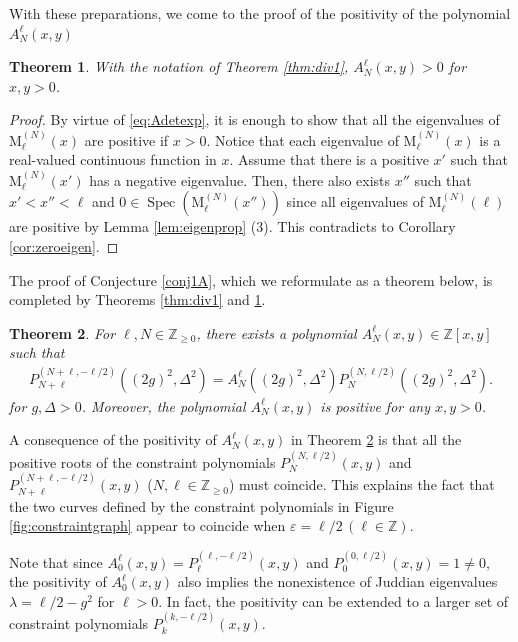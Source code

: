 \documentclass[11pt]{article}
\numberwithin{equation}{section}
\newcommand{\Z}{\mathbb{Z}} %
\newcommand{\e}{\varepsilon}
\newcommand{\cp}[2]{P^{(#1)}_{#2}} %
\DeclareMathOperator{\Spec}{Spec}
\newcommand{\MatSymbol}[1]{\bm{\mathrm{#1}}}
\newcommand{\mM}{\MatSymbol{M}}
\newcommand{\QEDhere}{\pushQED{\qed}\qedhere\popQED}
\theoremstyle{plain}
\newtheorem{thm}{Theorem}[section]
\theoremstyle{definition}
\theoremstyle{remark}
\begin{document}
With these preparations, we come to the proof of the positivity of the polynomial \(A_N^{\ell}(x,y)\)

\begin{thm} \label{thm:pos}
  With the notation of Theorem \ref{thm:div1}, \(A_N^{\ell}(x,y)> 0 \) for \(x,y>0\).
\end{thm}

\begin{proof}
  By virtue of \eqref{eq:Adetexp}, it is enough to show that all the eigenvalues of $\mM^{(N)}_{\ell}(x)$ are positive if $x>0$.
  Notice that each eigenvalue of $\mM^{(N)}_{\ell}(x)$ is a real-valued continuous function in $x$. Assume that there is a positive $x'$
  such that $\mM^{(N)}_{\ell}(x')$ has a negative eigenvalue. Then, there also exists $x''$ such that $x'<x''<\ell$ and $0\in\Spec(\mM^{(N)}_{\ell}(x''))$
  since all eigenvalues of $\mM^{(N)}_{\ell}(\ell)$ are positive by Lemma \ref{lem:eigenprop} (3). This contradicts to
  Corollary \ref{cor:zeroeigen}. 
\end{proof}

The proof of Conjecture \ref{conj1A}, which we reformulate as a theorem below, is completed by Theorems \ref{thm:div1} and \ref{thm:pos}.

\begin{thm} \label{thm:Main}
  For  \(\ell, N \in \Z_{\geq 0}\), there exists a polynomial \( A^\ell_N(x,y) \in \Z[x,y]\) such that
 \begin{align} \label{eq:conj:proved}
   \cp{N+\ell,-\ell/2}{N+\ell}((2g)^2,\Delta^2) =  A^\ell_N((2g)^2,\Delta^2) \cp{N,\ell/2}{N}((2g)^2,\Delta^2).
 \end{align}
 for \(g,\Delta >0 \). Moreover, the polynomial \( A^\ell_N(x,y)\) is positive for any $x, y > 0$. \QEDhere
\end{thm}

A consequence of the positivity of \( A^\ell_N(x,y)\) in Theorem \ref{thm:Main} is that all the positive roots of the constraint
polynomials \(\cp{N,\ell/2}{N}(x,y)\) and \(\cp{N+\ell,-\ell/2}{N+\ell}(x,y) \) (\(N,\ell \in \Z_{\geq 0}\)) must coincide.
This explains the fact that the two curves defined by the constraint polynomials
in Figure \ref{fig:constraintgraph} appear to coincide when \(\e = \ell/2\, (\ell \in \Z)\).

Note that since \(A_0^{\ell}(x,y) = \cp{\ell,-\ell/2}{\ell}(x,y)\) and \(\cp{0,\ell/2}{0}(x,y) = 1 \not= 0\), the positivity of
\(A_0^{\ell}(x,y)\) also implies the nonexistence of Juddian eigenvalues \(\lambda =  \ell/2 - g^2 \) for \(\ell > 0\). In fact, the
positivity can be extended to a larger set of constraint polynomials \( \cp{k,-\ell/2}{k}(x,y) \).
\end{document}
